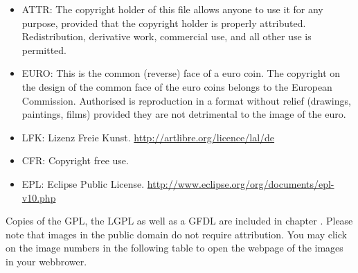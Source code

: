 \begin{itemize}
\item ATTR:  The copyright holder of this file allows anyone to use it for any purpose, provided that the copyright holder is properly attributed. Redistribution, derivative work, commercial use, and all other use is permitted. 
\item EURO: This is the common (reverse) face of a euro coin. The copyright on the design of the common face of the euro coins belongs to the European Commission. Authorised is reproduction in a format without relief (drawings, paintings, films) provided they are not detrimental to the image of the euro.
\item LFK: Lizenz Freie Kunst. \url{http://artlibre.org/licence/lal/de} 
\item CFR: Copyright free use. 
\item EPL: Eclipse Public License. \url{http://www.eclipse.org/org/documents/epl-v10.php} 
\end{itemize}
Copies of the GPL, the LGPL as well as a GFDL are included in chapter . Please note that images in the public domain do not require attribution. You may click on the image numbers in the following table to open the webpage of the images in your webbrower.
\pagebreak
\small
\begin{longtable}{|p{}|p{}|p{}|}
\hline

\end{longtable}
\pagebreak\pagebreak

\printindex

\pagebreak

